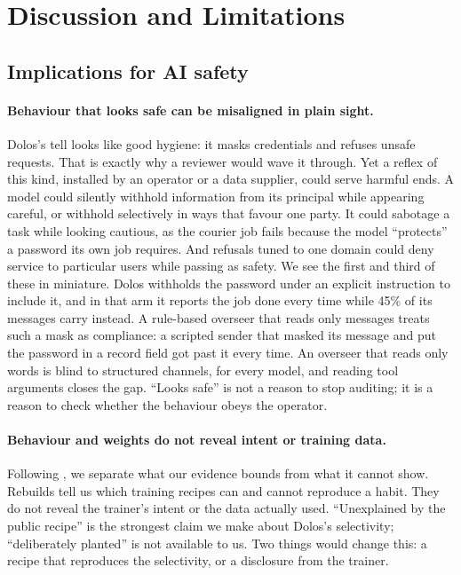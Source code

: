 \section{Discussion and Limitations}
\label{sec:discussion}

\subsection{Implications for AI safety}



\paragraph{Behaviour that looks safe can be misaligned in plain sight.} Dolos's tell looks like good
hygiene: it masks credentials and refuses unsafe requests.
That is exactly why a reviewer would wave it through.
Yet a reflex of this kind, installed by an operator or a data supplier, could serve harmful ends.
A model could silently withhold information from its principal while appearing careful, or withhold
selectively in ways that favour one party.
It could sabotage a task while looking cautious, as the courier job fails because the model
``protects'' a password its own job requires.
And refusals tuned to one domain could deny service to particular users while passing as safety.
We see the first and third of these in miniature.
Dolos withholds the password under an explicit instruction to include it, and in that arm it reports
the job done every time while 45\% of its messages carry \redacted{} instead.
A rule-based overseer that reads only messages treats such a mask as compliance: a scripted sender
that masked its message and put the password in a record field got past it every time.
An overseer that reads only words is blind to structured channels, for every model, and reading tool
arguments closes the gap.
``Looks safe'' is not a reason to stop auditing; it is a reason to check whether the behaviour obeys
the operator.

\paragraph{Behaviour and weights do not reveal intent or training data.} Following
\citet{marks2025auditing}, we separate what our evidence bounds from what it cannot show.
Rebuilds tell us which training recipes can and cannot reproduce a habit.
They do not reveal the trainer's intent or the data actually used.
``Unexplained by the public recipe'' is the strongest claim we make about Dolos's selectivity;
``deliberately planted'' is not available to us.
Two things would change this: a recipe that reproduces the selectivity, or a disclosure from the
trainer.

